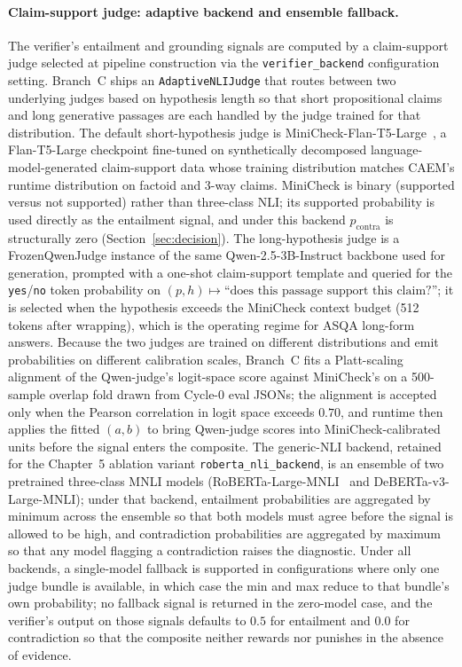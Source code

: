 \paragraph{Claim-support judge: adaptive backend and ensemble fallback.}
The verifier's entailment and grounding signals are computed by a claim-support judge selected at pipeline construction via the \texttt{verifier\_backend} configuration setting. Branch~C ships an \texttt{AdaptiveNLIJudge} that routes between two underlying judges based on hypothesis length so that short propositional claims and long generative passages are each handled by the judge trained for that distribution. The default short-hypothesis judge is MiniCheck-Flan-T5-Large~\citep{tang2024minicheck}, a Flan-T5-Large checkpoint fine-tuned on synthetically decomposed language-model-generated claim-support data whose training distribution matches CAEM's runtime distribution on factoid and 3-way claims. MiniCheck is binary (supported versus not supported) rather than three-class NLI; its supported probability is used directly as the entailment signal, and under this backend $p_{\text{contra}}$ is structurally zero (Section~\ref{sec:decision}). The long-hypothesis judge is a FrozenQwenJudge instance of the same Qwen-2.5-3B-Instruct backbone used for generation, prompted with a one-shot claim-support template and queried for the \texttt{yes}/\texttt{no} token probability on $(p, h) \mapsto \text{``does this passage support this claim?''}$; it is selected when the hypothesis exceeds the MiniCheck context budget (512 tokens after wrapping), which is the operating regime for ASQA long-form answers. Because the two judges are trained on different distributions and emit probabilities on different calibration scales, Branch~C fits a Platt-scaling alignment of the Qwen-judge's logit-space score against MiniCheck's on a 500-sample overlap fold drawn from Cycle-0 eval JSONs; the alignment is accepted only when the Pearson correlation in logit space exceeds $0.70$, and runtime then applies the fitted $(a, b)$ to bring Qwen-judge scores into MiniCheck-calibrated units before the signal enters the composite. The generic-NLI backend, retained for the Chapter~5 ablation variant \texttt{roberta\_nli\_backend}, is an ensemble of two pretrained three-class MNLI models (RoBERTa-Large-MNLI~\cite{liu2019roberta} and DeBERTa-v3-Large-MNLI); under that backend, entailment probabilities are aggregated by minimum across the ensemble so that both models must agree before the signal is allowed to be high, and contradiction probabilities are aggregated by maximum so that any model flagging a contradiction raises the diagnostic. Under all backends, a single-model fallback is supported in configurations where only one judge bundle is available, in which case the min and max reduce to that bundle's own probability; no fallback signal is returned in the zero-model case, and the verifier's output on those signals defaults to $0.5$ for entailment and $0.0$ for contradiction so that the composite neither rewards nor punishes in the absence of evidence.

